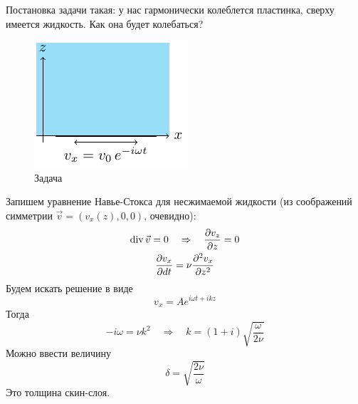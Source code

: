 Постановка задачи такая: у нас гармонически колеблется пластинка, сверху имеется жидкость. Как она будет колебаться?
\begin{figure}[h!]
    \centering
    \includegraphics[scale=1.5]{img/koleb}
    \caption{Задача}
    \label{fig:figure1}
\end{figure}
Запишем уравнение Навье-Стокса для несжимаемой жидкости (из соображений симметрии $\vec{v}=(v_x (z),0,0)$, очевидно):
\begin{gather}
    \operatorname{div} \vec{v} = 0 \quad \Rightarrow \quad \pdv{v_z}{z} = 0\\
    \pdv{v_x}{dt} = \nu \pdv[2]{v_x}{z}
\end{gather}
Будем искать решение в виде 
\begin{equation}
    v_x = A e^{i\omega t + ikz}
\end{equation}
Тогда
\begin{equation}
    -i \omega = \nu k^2 \quad \Rightarrow \quad
    k = (1+i) \sqrt{\frac{\omega}{2\nu}}
\end{equation}
Можно ввести величину
\begin{equation}
    \delta=\sqrt{\frac{2\nu}{\omega}}
\end{equation}
Это толщина скин-слоя.


